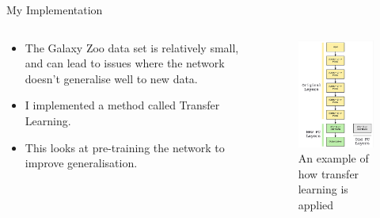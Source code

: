 \documentclass{beamer}
\begin{document}
\begin{frame}{My Implementation}
    \begin{columns}
    \begin{column}{0.6\textwidth}
    \begin{block}{}
    \begin{itemize}
        \item The Galaxy Zoo data set is relatively small, and can lead to issues where the network doesn't generalise well to new data.
        \item I implemented a method called Transfer Learning.
        \item This looks at pre-training the network to improve generalisation.
    \end{itemize}
    \end{block}
    \end{column}
    \begin{column}{0.4\textwidth}
    \begin{figure}
        \centering
        \includegraphics[width=.9\textwidth, height =0.6\textheight]{Figures/transferpic.png}
        \caption{An example of how transfer learning is applied}
        \label{fig:transferlearn}
    \end{figure}
    \end{column}
    \end{columns}
\end{frame}
\end{document}
